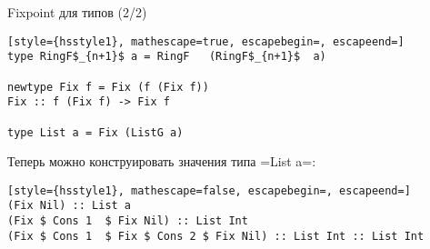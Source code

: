 \documentclass[
  xcolor={svgnames},
  hyperref={colorlinks,citecolor=DeepPink4,linkcolor=DarkRed,urlcolor=DarkBlue}]{beamer}
\begin{document}
\begin{frame}[fragile]{Fixpoint для типов (2/2)}
 
\begin{lstlisting}[style={hsstyle1}, mathescape=true, escapebegin=, escapeend=]
type RingF$_{n+1}$ a = RingF   (RingF$_{n+1}$  a)

newtype Fix f = Fix (f (Fix f))
Fix :: f (Fix f) -> Fix f

type List a = Fix (ListG a)
\end{lstlisting}
Теперь можно конструировать значения типа \hsinline=List a=:\pause
\begin{lstlisting}[style={hsstyle1}, mathescape=false, escapebegin=, escapeend=]
(Fix Nil) :: List a
(Fix $ Cons 1  $ Fix Nil) :: List Int
(Fix $ Cons 1  $ Fix $ Cons 2 $ Fix Nil) :: List Int :: List Int
\end{lstlisting}
\end{frame}
\end{document}
